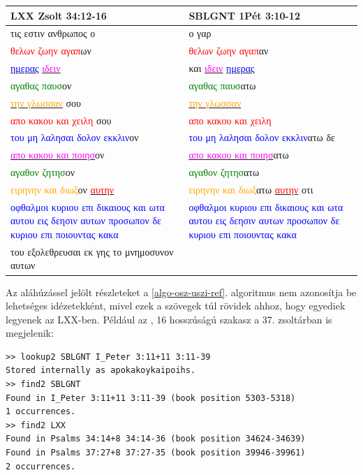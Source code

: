 \documentclass{article}
\newcommand\gr{\selectlanguage{greek}\frenchspacing}
\newcommand\hu{\selectlanguage{magyar}\frenchspacing}
\begin{document}
\begin{center}
\begin{tabular}{p{5cm} p{5cm}}
LXX Zsolt 34:12-16 & SBLGNT 1Pét 3:10-12\\
\hline
{\gr τις εστιν ανθρωπος ο} &
{\gr ο γαρ}\\
{\gr \textcolor{red}{θελων ζωην αγαπ}ων} & %
{\gr \textcolor{red}{θελων ζωην αγαπ}αν}\\ %
{\gr \underline{\textcolor{blue}{ημερας}} \underline{\textcolor{magenta}{ιδειν}}} &
{\gr και \underline{\textcolor{magenta}{ιδειν}} \underline{\textcolor{blue}{ημερας}}}\\
{\gr \textcolor{green}{αγαθας παυσ}ον}& %
{\gr \textcolor{green}{αγαθας παυσ}ατω}\\ %
{\gr \underline{\textcolor{orange}{την γλωσσαν}} σου}&
{\gr \underline{\textcolor{orange}{την γλωσσαν}}}\\
{\gr \textcolor{red}{απο κακου και χειλη} σου}& %
{\gr \textcolor{red}{απο κακου και χειλη}}\\ %
{\gr \textcolor{blue}{του μη λαλησαι δολον εκκλιν}ον}& %
{\gr \textcolor{blue}{του μη λαλησαι δολον εκκλιν}ατω δε}\\ %
{\gr \underline{\textcolor{magenta}{απο κακου και ποιησ}}ον}&
{\gr \underline{\textcolor{magenta}{απο κακου και ποιησ}}ατω}\\
{\gr \textcolor{green}{αγαθον ζητησ}ον}& %
{\gr \textcolor{green}{αγαθον ζητησ}ατω}\\ %
{\gr \textcolor{orange}{ειρηνην και διωξ}ον \underline{\textcolor{red}{αυτην}}}& %
{\gr \textcolor{orange}{ειρηνην και διωξ}ατω \underline{\textcolor{red}{αυτην}} οτι}\\ %
{\gr \textcolor{blue}{οφθαλμοι κυριου επι δικαιους και ωτα αυτου εις δεησιν αυτων \hfill\break προσωπον δε κυριου επι ποιουντας κακα}}& %
{\gr \textcolor{blue}{οφθαλμοι κυριου επι δικαιους και ωτα αυτου εις δεησιν αυτων \hfill\break προσωπον δε κυριου επι ποιουντας κακα}}\\ %
{\gr του εξολεθρευσαι εκ γης το \hfill\break μνημοσυνον αυτων}&
\end{tabular}
\end{center}
\hu
Az aláhúzássel jelölt részleteket a \ref{algo-osz-uszi-ref}. algoritmus nem azonosítja be
lehetséges idézetekként, mivel ezek a szövegek túl rövidek ahhoz, hogy egyediek legyenek az LXX-ben.
Például az {\gr {απο κακου και ποιησ$\ldots$}}, 16 hosszúságú szakasz a 37. zsoltárban is megjelenik:
\begin{lstlisting}
>> lookup2 SBLGNT I_Peter 3:11+11 3:11-39
Stored internally as apokakoykaipoihs.
>> find2 SBLGNT
Found in I_Peter 3:11+11 3:11-39 (book position 5303-5318)
1 occurrences.
>> find2 LXX
Found in Psalms 34:14+8 34:14-36 (book position 34624-34639)
Found in Psalms 37:27+8 37:27-35 (book position 39946-39961)
2 occurrences.
\end{lstlisting}
\end{document}
